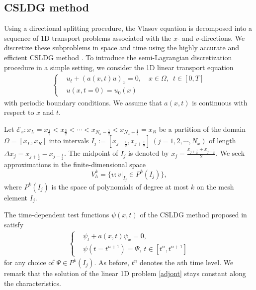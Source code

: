 \documentclass[letterpaper,10pt]{article}
\numberwithin{equation}{section}
\numberwithin{figure}{section}
\numberwithin{table}{section}
\begin{document}
\subsection{CSLDG method}
\hspace{4pt}
Using a directional splitting procedure, the Vlasov equation is decomposed into a sequence of 1D transport problems associated with the $x$- and $v$-directions. We discretize these subproblems in space and time using the highly accurate and efficient CSLDG method \cite{QIU2011DG,Cai2017}. To introduce the semi-Lagrangian discretization procedure in a simple setting, we consider the 1D linear transport equation
\begin{align}\label{trans1D}
    \left\{
        \begin{aligned}
            &u_t+(a(x,t)u)_x=0,\quad x\in \Omega,\enspace t\in [0,T]\\
            &u(x,t=0)=u_0(x)
        \end{aligned}
    \right.
\end{align}
with periodic boundary conditions. We assume that $a(x,t)$ is continuous with respect to $x$ and $t$.

Let $\mathcal{E}_x: x_L=x_{\frac{1}{2}}<x_{\frac{3}{2}}<\cdots<x_{N_x-\frac{1}{2}}<x_{N_x+\frac{1}{2}}=x_R$ be a partition of the domain $\Omega=[x_L,x_R]$ into intervals $I_{j}:=\left[x_{j-\frac{1}{2}},x_{j+\frac{1}{2}}\right]~(j=1,2,\cdots,N_x)$ of length $\Delta x_j=x_{j+\frac{1}{2}}-x_{j-\frac{1}{2}}$. The midpoint of $I_{j}$ is denoted by $x_j=\frac{x_{j+\frac{1}{2}}+x_{j-\frac{1}{2}}}{2}$. We seek approximations in the  finite-dimensional space
$$
    V_h^k=\{v:v|_{I_j}\in P^k(I_{j})\},
$$
where $P^k(I_{j})$ is the space of polynomials of degree at most $k$ on the mesh element $I_{j}$.

The time-dependent test functions $\psi(x,t)$ of the CSLDG method proposed in \cite{Cai2017} satisfy 
\begin{align}\label{adjont}
    \left\{
        \begin{aligned}
            &\psi_t+a(x, t) \psi_x=0, \\
            &\psi\left(t=t^{n+1}\right)=\Psi,~t\in[t^n,t^{n+1}]
        \end{aligned}
    \right.
\end{align}
for any choice of $\Psi \in P^k(I_{j})$. As before,
 $t^n$ denotes the $n$th time level. We remark that the solution of the linear
1D problem \eqref{adjont} stays constant along the characteristics.
 
\end{document}
